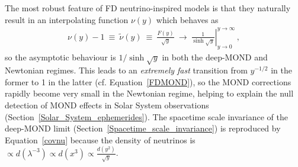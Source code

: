 \documentclass[fleqn,usenatbib,useAMS,onecolumn]{mnras} %
\begin{document}

The most robust feature of FD neutrino-inspired models is that they naturally result in an interpolating function $\nu(y)$ which behaves as
\begin{eqnarray}
	\nu \left( y \right) - 1 ~\equiv~ \widetilde{\nu} \left( y \right) ~\equiv~ \frac{F\left(y\right)}{\sqrt{y}} ~\to~ \left.{\frac{1}{\sinh \sqrt{y}}}\right|_{y \to 0}^{y \to \infty} \, ,
\end{eqnarray}
so the asymptotic behaviour is $1/\sinh\sqrt{y}$ in both the deep-MOND and Newtonian regimes. This leads to an \emph{extremely fast} transition from $y^{-1/2}$ in the former to 1 in the latter (cf. Equation~\ref{FDMOND}), so the MOND corrections rapidly become very small in the Newtonian regime, helping to explain the null detection of MOND effects in Solar System observations (Section~\ref{Solar_System_ephemerides}). The spacetime scale invariance of the deep-MOND limit (Section~\ref{Spacetime_scale_invariance}) is reproduced by Equation~\ref{covnu} because the density of neutrinos is $\propto d (\lambda^{-3}) \propto d(x^3) \propto \frac{d(y^2)}{\sqrt{y}}$.  
\end{document}
